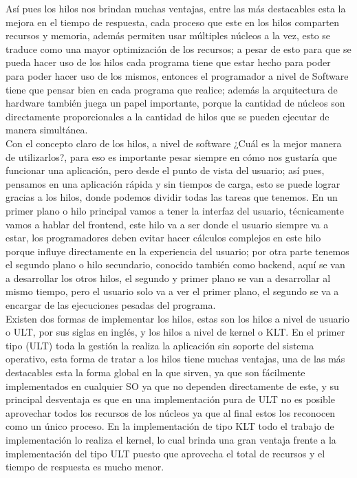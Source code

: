 \documentclass{article}
\begin{document}
Así pues los hilos nos brindan muchas ventajas, entre las más destacables esta la mejora en el tiempo de respuesta, cada proceso que este en los hilos comparten recursos y memoria, además permiten usar múltiples núcleos a la vez, esto se traduce como una mayor optimización de los recursos; a pesar de esto para que se pueda hacer uso de los hilos cada programa tiene que estar hecho para poder para poder hacer uso de los mismos, entonces el programador a nivel de Software tiene que pensar bien en cada programa que realice; además la arquitectura de hardware también juega un papel importante, porque la cantidad de núcleos son directamente proporcionales a la cantidad de hilos que se pueden ejecutar de manera simultánea.\\

Con el concepto claro de los hilos, a nivel de software ¿Cuál es la mejor manera de utilizarlos?, para eso es importante pesar siempre en cómo nos gustaría que funcionar una aplicación, pero desde el punto de vista del usuario; así pues, pensamos en una aplicación rápida y sin tiempos de carga, esto se puede lograr gracias a los hilos,  donde podemos dividir todas las tareas que tenemos. En un primer plano o hilo principal vamos a tener la interfaz del usuario, técnicamente vamos a hablar del frontend, \cite{Ram} este hilo va a ser donde el usuario siempre va a estar, los programadores deben evitar hacer cálculos complejos en este hilo porque influye directamente en la experiencia del usuario; por otra parte tenemos el segundo plano o hilo secundario, conocido también como backend, \cite{Ram} aquí se van a desarrollar los otros hilos, el segundo y primer plano se van a desarrollar al mismo tiempo, pero el usuario solo va a ver el primer plano, el segundo se va a encargar de las ejecuciones pesadas del programa.\\

Existen dos formas de implementar los hilos, estas son los hilos a nivel de usuario o ULT, por sus siglas en inglés, y los hilos a nivel de kernel o KLT. En el primer tipo (ULT) toda la gestión la realiza la aplicación sin soporte del sistema operativo, esta forma de tratar a los hilos tiene muchas ventajas, una de las más destacables esta la forma global en la que sirven, ya que son fácilmente implementados en cualquier SO ya que no dependen directamente de este, y su principal desventaja es que en una implementación pura de ULT no es posible aprovechar todos los recursos de los núcleos ya que al final estos los reconocen como un único proceso. En la implementación de tipo KLT todo el trabajo de implementación lo realiza el kernel, lo cual brinda una gran ventaja frente a la implementación del tipo ULT puesto que aprovecha el total de recursos y el tiempo de respuesta es mucho menor.\\
\end{document}
